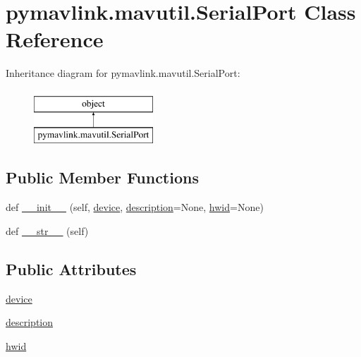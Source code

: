 \hypertarget{classpymavlink_1_1mavutil_1_1SerialPort}{}\section{pymavlink.\+mavutil.\+Serial\+Port Class Reference}
\label{classpymavlink_1_1mavutil_1_1SerialPort}
Inheritance diagram for pymavlink.\+mavutil.\+Serial\+Port\+:\begin{figure}[H]
\begin{center}
\leavevmode
\includegraphics[height=2.000000cm]{classpymavlink_1_1mavutil_1_1SerialPort}
\end{center}
\end{figure}
\subsection*{Public Member Functions}
\begin{DoxyCompactItemize}
\item 
def \mbox{\hyperlink{classpymavlink_1_1mavutil_1_1SerialPort_a1fc475b038be7d01e9bbd3f8b4d8c573}{\+\_\+\+\_\+init\+\_\+\+\_\+}} (self, \mbox{\hyperlink{classpymavlink_1_1mavutil_1_1SerialPort_adab21d2b77fd40dd3f44247c56756546}{device}}, \mbox{\hyperlink{classpymavlink_1_1mavutil_1_1SerialPort_ac3943442497a938ab8be65fcfce4eb62}{description}}=None, \mbox{\hyperlink{classpymavlink_1_1mavutil_1_1SerialPort_a582a43548e6708f07c7c8daaa73b8980}{hwid}}=None)
\item 
def \mbox{\hyperlink{classpymavlink_1_1mavutil_1_1SerialPort_a577fb69c14065d576592d2e15977366a}{\+\_\+\+\_\+str\+\_\+\+\_\+}} (self)
\end{DoxyCompactItemize}
\subsection*{Public Attributes}
\begin{DoxyCompactItemize}
\item 
\mbox{\hyperlink{classpymavlink_1_1mavutil_1_1SerialPort_adab21d2b77fd40dd3f44247c56756546}{device}}
\item 
\mbox{\hyperlink{classpymavlink_1_1mavutil_1_1SerialPort_ac3943442497a938ab8be65fcfce4eb62}{description}}
\item 
\mbox{\hyperlink{classpymavlink_1_1mavutil_1_1SerialPort_a582a43548e6708f07c7c8daaa73b8980}{hwid}}
\end{DoxyCompactItemize}


